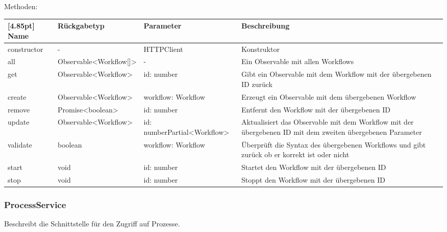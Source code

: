			Methoden:
			\begin{center}
			\setlength\tabcolsep{5pt}
				\renewcommand{\arraystretch}{1.5}
					\begin{tabularx}{\textwidth}{|l|l|p{35mm}|X|}
					\hline
					\rowcolor[gray]{0.75}[4.85pt]
					Name & Rückgabetyp & Parameter & Beschreibung \\ \hline 
					constructor & - & HTTPClient & Konstruktor \\ \hline
					all & Observable<Workflow[]> & - & Ein Observable mit allen Workflows\\ \hline
					get & Observable<Workflow> & id: number & Gibt ein Observable mit dem Workflow mit der übergebenen ID zurück \\ \hline
					create & Observable<Workflow> & workflow: Workflow & Erzeugt ein Observable mit dem übergebenen Workflow \\ \hline
					remove & Promise<boolean> & id: number & Entfernt den Workflow mit der übergebenen ID \\ \hline
					update & Observable<Workflow> & id: number\newline Partial<Workflow> & Aktualisiert das Observable mit dem Workflow mit der übergebenen ID mit dem zweiten übergebenen Parameter \\ \hline
					validate & boolean & workflow: Workflow & Überprüft die Syntax des übergebenen Workflows und gibt zurück ob er korrekt ist oder nicht \\ \hline
					start & void & id: number & Startet den Workflow mit der übergebenen ID \\ \hline
					stop & void & id: number & Stoppt den Workflow mit der übergebenen ID \\ \hline
					\end{tabularx}
			\end{center}
\newpage
			
			\subsubsection{ProcessService}
			
			Beschreibt die Schnittstelle für den Zugriff auf Prozesse.\newline
			
